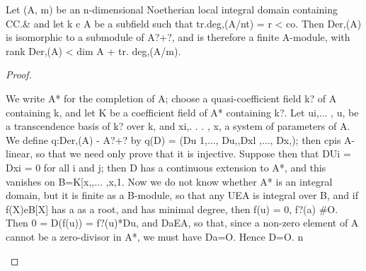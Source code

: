 \begin{theorem}[Theorem 30.7]\label{mcrt-auto-theorem-30-7}\uses{}
\begin{mathematicalrecord}
Let (A, m) be an n-dimensional Noetherian local integral
 domain containing CC.&    and let k c A be a subfield such that tr.deg,(A/nt) =
 r < co. Then Der,(A) is isomorphic to a submodule of A?+?, and is therefore
 a finite A-module, with
            rank Der,(A) < dim A + tr. deg,(A/m).
\end{mathematicalrecord}
\end{theorem}
\begin{proof}
\begin{mathematicalrecord}
We write A* for the completion of A; choose a quasi-coefficient
field k? of A containing k, and let K be a coefficient field of A* containing
k?. Let ui,... , u, be a transcendence basis of k? over k, and xi,. . . , x, a
 system of parameters of A. We define q:Der,(A) - A?+? by q(D) =
(Du 1,..., Du,,Dxl ,..., Dx,); then cpis A-linear, so that we need only prove
that it is injective. Suppose then that DUi = Dxi = 0 for all i and j; then D
 has a continuous           extension     to A*, and this vanishes on
 B=K[x,,...       ,x,1. Now  we do  not know  whether A* is an integral domain,
 but it is finite as a B-module, so that any UEA is integral over B, and if
 f(X)eB[X]       has a as a root, and has minimal degree, then f(u) = 0,
f?(a) #O. Then 0 = D(f(u)) = f?(u)*Du,          and DaEA, so that, since a
 non-zero element of A cannot be a zero-divisor in A*, we must have
 Da=O. Hence D=O.            n
\end{mathematicalrecord}
\end{proof}


